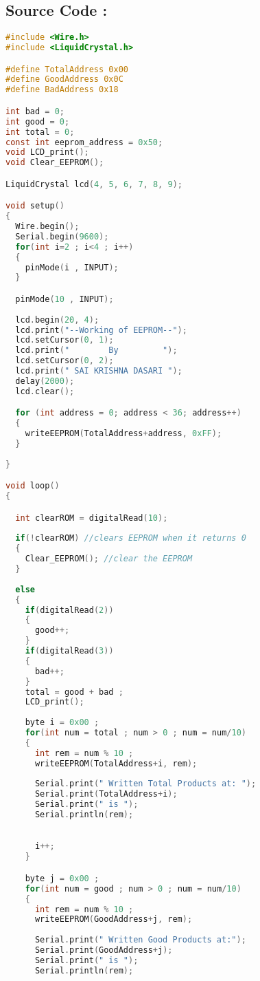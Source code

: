 \documentclass[12pt]{article}
\begin{document}
 \subsection*{\textbf{Source Code :}}
  \begin{lstlisting}[language=C] 
#include <Wire.h>
#include <LiquidCrystal.h>

#define TotalAddress 0x00
#define GoodAddress 0x0C
#define BadAddress 0x18 

int bad = 0;
int good = 0;
int total = 0;
const int eeprom_address = 0x50;  
void LCD_print();
void Clear_EEPROM();

LiquidCrystal lcd(4, 5, 6, 7, 8, 9);

void setup() 
{
  Wire.begin();
  Serial.begin(9600);
  for(int i=2 ; i<4 ; i++)
  {
    pinMode(i , INPUT);
  }

  pinMode(10 , INPUT);
  
  lcd.begin(20, 4);
  lcd.print("--Working of EEPROM--");
  lcd.setCursor(0, 1);
  lcd.print("        By         ");
  lcd.setCursor(0, 2);
  lcd.print(" SAI KRISHNA DASARI ");  
  delay(2000);
  lcd.clear();

  for (int address = 0; address < 36; address++)
  {
    writeEEPROM(TotalAddress+address, 0xFF);
  }
  
}

void loop() 
{

  int clearROM = digitalRead(10);
  
  if(!clearROM) //clears EEPROM when it returns 0
  {
    Clear_EEPROM(); //clear the EEPROM
  }
  
  else
  {
    if(digitalRead(2))
    {
      good++;
    }
    if(digitalRead(3))
    {
      bad++;
    }
    total = good + bad ;
    LCD_print();
    
    byte i = 0x00 ;
    for(int num = total ; num > 0 ; num = num/10)
    {
      int rem = num % 10 ;
      writeEEPROM(TotalAddress+i, rem); 
      
      Serial.print(" Written Total Products at: ");
      Serial.print(TotalAddress+i);
      Serial.print(" is ");
      Serial.println(rem);

      
      i++;
    }

    byte j = 0x00 ;
    for(int num = good ; num > 0 ; num = num/10)
    {
      int rem = num % 10 ;
      writeEEPROM(GoodAddress+j, rem);
      
      Serial.print(" Written Good Products at:");
      Serial.print(GoodAddress+j);
      Serial.print(" is ");
      Serial.println(rem);
      

\end{lstlisting}
\end{document}
